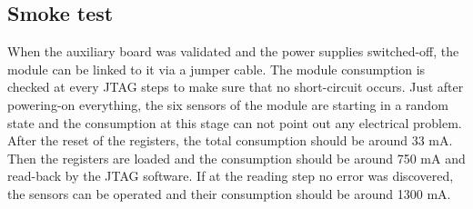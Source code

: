 



  \subsection{Smoke test}


  When the auxiliary board was validated and the power supplies switched-off, the module can be linked to it via a jumper cable.
  The module consumption is checked at every JTAG steps to make sure that no short-circuit occurs.
  Just after powering-on everything, the six sensors of the module are starting in a random state and the consumption at this stage can not point out any electrical problem.
  After the reset of the registers, the total consumption should be around 33 mA.
  Then the registers are loaded and the consumption should be around 750 mA and read-back by the JTAG software.
  If at the reading step no error was discovered, the sensors can be operated and their consumption should be around 1300 mA.

